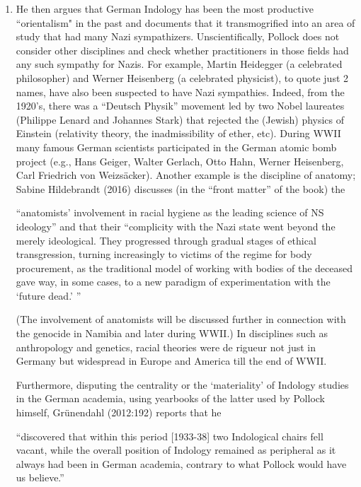 {\begin{enumerate}
\item He then argues that German Indology has been the most productive “orientalism" in the past and documents that it transmogrified into an area of study that had many Nazi sympathizers. Unscientifically, Pollock does not consider other disciplines and check whether practitioners in those fields had any such sympathy for Nazis. For example, Martin Heidegger (a celebrated philosopher) and Werner Heisenberg (a celebrated physicist), to quote just 2 names, have also been suspected to have Nazi sympathies. Indeed, from the 1920’s, there was a “Deutsch Physik” movement led by two Nobel laureates (Philippe Lenard and Johannes Stark) that rejected the (Jewish) physics of Einstein (relativity theory, the inadmissibility of ether, etc). During WWII many famous German scientists participated in the German atomic bomb project (e.g., Hans Geiger, Walter Gerlach, Otto Hahn, Werner Heisenberg, Carl Friedrich von Weizsäcker). Another example is the discipline of anatomy; Sabine Hildebrandt (2016) discusses (in the “front matter” of the book) the 
\begin{myquote}
“anatomists’ involvement in racial hygiene as the leading science of NS ideology” and that their “complicity with the Nazi state went beyond the merely ideological. They progressed through gradual stages of ethical transgression, turning increasingly to victims of the regime for body procurement, as the traditional model of working with bodies of the deceased gave way, in some cases, to a new paradigm of experimentation with the ‘future dead.’ ”
\end{myquote}

(The involvement of anatomists will be discussed further in connection with the genocide in Namibia and later during WWII.) In disciplines such as anthropology and genetics, racial theories were de rigueur not just in Germany but widespread in Europe and America till the end of WWII. 

Furthermore, disputing the centrality or the ‘materiality’ of Indology studies in the German academia, using yearbooks of the latter used by Pollock himself, Grünendahl (2012:192) reports that he

\begin{myquote}
“discovered that within this period [1933-38] two Indological chairs fell vacant, while the overall position of Indology remained as peripheral as it always had been in German academia, contrary to what Pollock would have us believe.”
\end{myquote}


\end{enumerate}}
